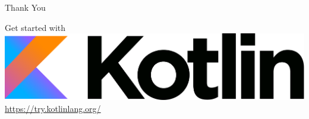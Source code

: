 \begin{frame}{Thank You}
	\begin{center}
		\LARGE Get started with\\
		\vspace{.5cm}
		{\includegraphics[width=.5\paperwidth]{figures/kotlinLogo2}}\\
		\vspace{.5cm}
		\href{https://try.kotlinlang.org/}{https://try.kotlinlang.org/}
	\end{center}
\end{frame}